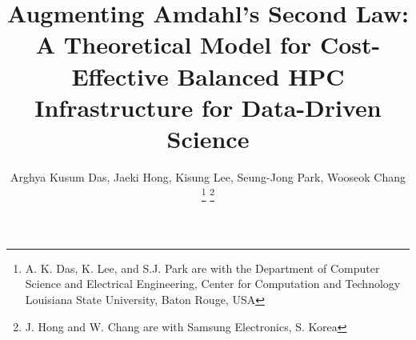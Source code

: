 \documentclass[journal]{IEEEtran}
\begin{document}
%
\title{Augmenting Amdahl's Second Law:  A Theoretical Model for Cost-Effective Balanced HPC Infrastructure for Data-Driven Science}
%
%
%

\author{
Arghya Kusum Das, %
Jaeki Hong, 
Kisung Lee, %
Seung-Jong Park, %
Wooseok Chang\\
\thanks{A. K. Das, K. Lee, and S.J. Park are with the Department
of Computer Science and Electrical Engineering, Center for Computation and Technology Louisiana State University, Baton Rouge, USA}
\thanks{J. Hong and W. Chang are with Samsung Electronics, S. Korea}
}

% 
%
\end{document}
